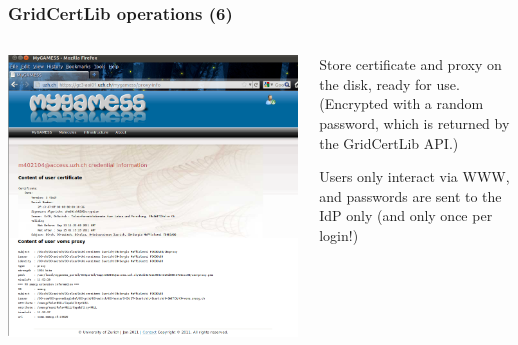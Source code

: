 \documentclass{beamer}
\newcommand{\+}{\vspace{1em}}
\begin{document}
\begin{frame}
  \frametitle{GridCertLib operations (6)}
  \begin{columns}
    \begin{column}{0.45\textwidth}
      \includegraphics[width=\linewidth]{mygamess}
    \end{column}
    \begin{column}{0.55\textwidth}
      \begin{center}
        Store certificate and proxy on the disk, ready for use.
        \\
        {\footnotesize (Encrypted with a random password, which is
          returned by the GridCertLib API.)}
      
        \+ {Users only interact via WWW, and
          passwords are sent to the IdP only (and only once per
          login!)}
      \end{center}
    \end{column}
  \end{columns}
\end{frame}
\end{document}
